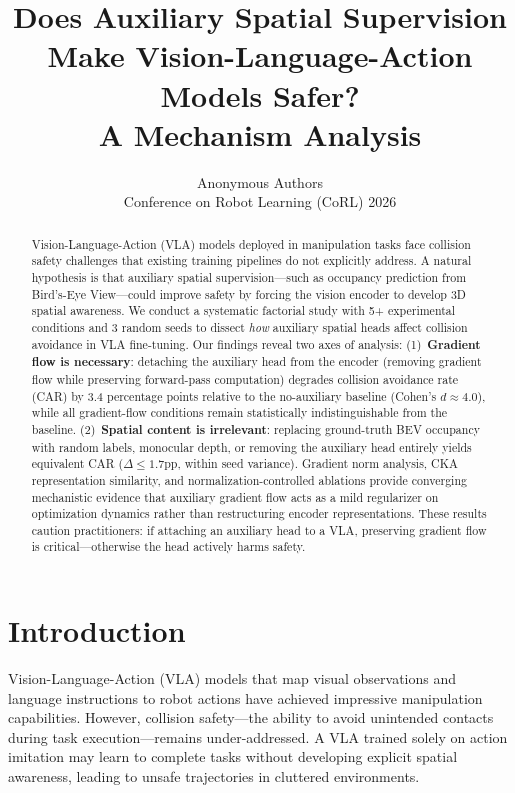 \documentclass[10pt,letterpaper]{article}
\title{Does Auxiliary Spatial Supervision Make Vision-Language-Action Models Safer?\\A Mechanism Analysis}
\author{
  Anonymous Authors\\
  Conference on Robot Learning (CoRL) 2026
}
\date{}
\begin{document}
\maketitle

\begin{abstract}
Vision-Language-Action (VLA) models deployed in manipulation tasks face collision safety challenges that existing training pipelines do not explicitly address.
A natural hypothesis is that auxiliary spatial supervision---such as occupancy prediction from Bird's-Eye View---could improve safety by forcing the vision encoder to develop 3D spatial awareness.
We conduct a systematic factorial study with 5+ experimental conditions and 3 random seeds to dissect \emph{how} auxiliary spatial heads affect collision avoidance in VLA fine-tuning.
Our findings reveal two axes of analysis:
(1)~\textbf{Gradient flow is necessary}: detaching the auxiliary head from the encoder (removing gradient flow while preserving forward-pass computation) degrades collision avoidance rate (CAR) by 3.4 percentage points relative to the no-auxiliary baseline (Cohen's $d\!\approx\!4.0$), while all gradient-flow conditions remain statistically indistinguishable from the baseline.
(2)~\textbf{Spatial content is irrelevant}: replacing ground-truth BEV occupancy with random labels, monocular depth, or removing the auxiliary head entirely yields equivalent CAR ($\Delta\!\leq\!1.7$pp, within seed variance).
Gradient norm analysis, CKA representation similarity, and normalization-controlled ablations provide converging mechanistic evidence that auxiliary gradient flow acts as a mild regularizer on optimization dynamics rather than restructuring encoder representations.
These results caution practitioners: if attaching an auxiliary head to a VLA, preserving gradient flow is critical---otherwise the head actively harms safety.
\end{abstract}

\section{Introduction}
\label{sec:intro}

Vision-Language-Action (VLA) models that map visual observations and language instructions to robot actions have achieved impressive manipulation capabilities. However, collision safety---the ability to avoid unintended contacts during task execution---remains under-addressed. A VLA trained solely on action imitation may learn to complete tasks without developing explicit spatial awareness, leading to unsafe trajectories in cluttered environments.
\end{document}
